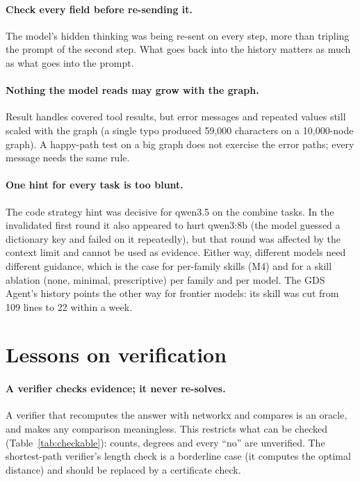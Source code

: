 \paragraph{Check every field before re-sending it.} The model's hidden thinking was being re-sent on every step,
more than tripling the prompt of the second step. What goes back into the history matters as much as what goes into the prompt.

\paragraph{Nothing the model reads may grow with the graph.} Result handles covered tool results, but error messages
and repeated values still scaled with the graph (a single typo produced 59,000 characters on a 10,000-node graph). A
happy-path test on a big graph does not exercise the error paths; every message needs the same rule.

\paragraph{One hint for every task is too blunt.} The code strategy hint was decisive for qwen3.5 on the combine tasks.
In the invalidated first round it also appeared to hurt qwen3:8b (the model guessed a dictionary key and failed on it
repeatedly), but that round was affected by the context limit and cannot be used as evidence. Either way, different
models need different guidance, which is the case for per-family skills (M4) and for a skill ablation (none, minimal,
prescriptive) per family and per model. The GDS Agent's history points the other way for frontier models: its skill
was cut from 109 lines to 22 within a week.

\section{Lessons on verification}

\paragraph{A verifier checks evidence; it never re-solves.} A verifier that recomputes the answer with networkx and
compares is an oracle, and makes any comparison meaningless. This restricts what can be checked
(Table~\ref{tab:checkable}): counts, degrees and every ``no'' are unverified. The shortest-path verifier's length check
is a borderline case (it computes the optimal distance) and should be replaced by a certificate check.

